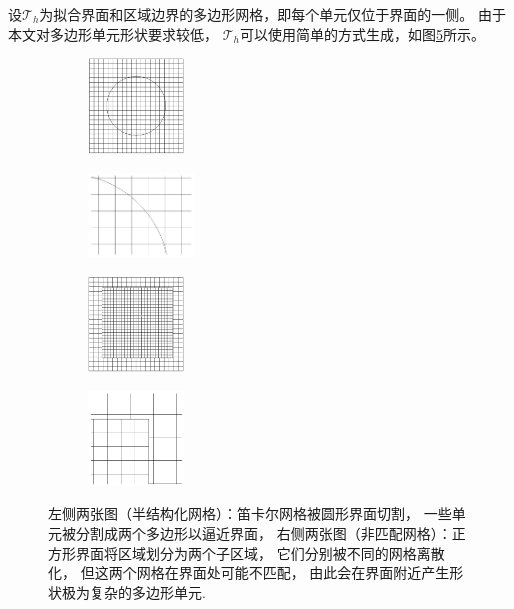 设$\mathcal{T}_h$为拟合界面和区域边界的多边形网格，即每个单元仅位于界面的一侧。
由于本文对多边形单元形状要求较低，
$\mathcal{T}_h$可以使用简单的方式生成，如图\ref{fig:NonConfMesh}所示。

\begin{figure}[h]
\centering
\begin{subfigure}{.2\textwidth}
    \includegraphics[width=1in]{./figures/maxwell/UnfitMesh1}
     \label{fig:UnfitMesh1} %
\end{subfigure}
 \begin{subfigure}{.2\textwidth}
     \includegraphics[width=1.1in]{./figures/maxwell/UnfitMesh2}
     \label{fig:UnfitMesh2} %
\end{subfigure}
\begin{subfigure}{.2\textwidth}
    \includegraphics[width=1in]{./figures/maxwell/NonConfMesh1}
     \label{fig:NonConfMesh1} %
\end{subfigure}
 \begin{subfigure}{.2\textwidth}
     \includegraphics[width=1in]{./figures/maxwell/NonConfMesh2}
     \label{fig:NonConfMesh2} %
\end{subfigure}
     \caption{左侧两张图（半结构化网格）：笛卡尔网格被圆形界面切割，
         一些单元被分割成两个多边形以逼近界面，
     右侧两张图（非匹配网格）：正方形界面将区域划分为两个子区域，
     它们分别被不同的网格离散化，
     但这两个网格在界面处可能不匹配，
 由此会在界面附近产生形状极为复杂的多边形单元.}
  \label{fig:NonConfMesh} %
\end{figure}

